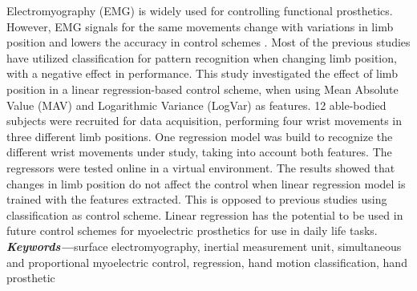 Electromyography (EMG) is widely used for controlling functional prosthetics. However, EMG signals for the same movements change with variations in limb position and lowers the accuracy in control schemes \cite{fougner2012}. Most of the previous studies have utilized classification for pattern recognition when changing limb position, with a negative effect in performance. %
This study investigated the effect of limb position in a linear regression-based control scheme, when using 
Mean Absolute Value (MAV) and Logarithmic Variance (LogVar) as features. %
12 able-bodied subjects were recruited for data acquisition, performing four wrist movements in three different limb positions. One regression model was build to recognize the different wrist movements under study, taking into account both features. %
The regressors were tested online in a virtual environment. %
The results showed that changes in limb position do not affect the control when linear regression model is trained with the %
features extracted. This is opposed to previous studies using classification as control scheme. Linear regression has the potential to be used in future control schemes for myoelectric prosthetics for use in daily life tasks.\\


\textit{\textbf{Keywords---}}surface electromyography, inertial measurement unit, simultaneous and proportional myoelectric control, regression, hand motion classification, hand prosthetic


